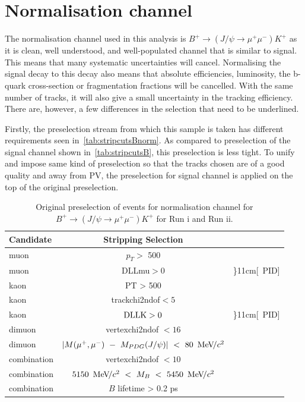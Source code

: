 \section{Normalisation channel}
\label{nchannel}
The normalisation channel used in this analysis is $ B^{+} \rightarrow (J/\psi \rightarrow \mu^{+} \mu^{-}) K^{+}$
as it is clean, well understood, and well-populated channel that is similar to signal. This means that many systematic uncertainties will cancel. Normalising the signal decay to this decay also means that absolute efficiencies, luminosity, the b-quark cross-section or fragmentation fractions will be cancelled. With the same number of tracks, it will also give a small uncertainty in the tracking efficiency. There are, however, a few differences in the selection that need to be underlined.

Firstly, the preselection stream from which this sample is taken has different requirements seen in~\autoref{tab:stripcutsBnorm}. As compared to preselection of the signal channel shown in~\autoref{tab:stripcutsB}, this preselection is less tight. To unify and impose same kind of preselection so that the tracks chosen are of a good quality and away from \gls{PV}, the preselection for signal channel is applied on the top of the original preselection.


\begin{table}%
\begin{center}
\begin{tabular}{l|c l }

    \toprule
     Candidate & Stripping Selection \\ \hline

	muon & $p_{T} >$ 500 \mev \\ 

	
	muon & DLLmu$ > 0$ & \rdelim\}{1}{1cm}[\ \gls{PID}] \\ \hline

	kaon & PT > 500 \mev \\ 
	kaon & \gls{trackchi2ndof}$ < 5$ \\
	kaon & $\rm{DLLK} > 0$ & \rdelim\}{1}{1cm}[\ \gls{PID}] \\ \hline

	dimuon & \gls{vertexchi2ndof} $< 16$ \\
	dimuon & $| M(\mu^{+},\mu^{-})\ -\ M_{PDG}(J/\psi)|\ <\ 80\ {\mathrm{\,Me\kern -0.1em V\!/}c^2}$ \\ \hline

	combination & \gls{vertexchi2ndof} $< 10$ \\
	combination & $5150\ \mevcc\ <\ M_B\ <\ 5450\ \mevcc$ \\
	combination & $B$ lifetime > 0.2 ps \\ \bottomrule
     \end{tabular}

\end{center}
	\caption{Original preselection of events for normalisation channel for $B^{+} \rightarrow (J/\psi \rightarrow \mu^{+} \mu^{-}) K^{+}$ for Run \Rn{1} and Run \Rn{2}. }
\label{tab:stripcutsBnorm}
\end{table}


